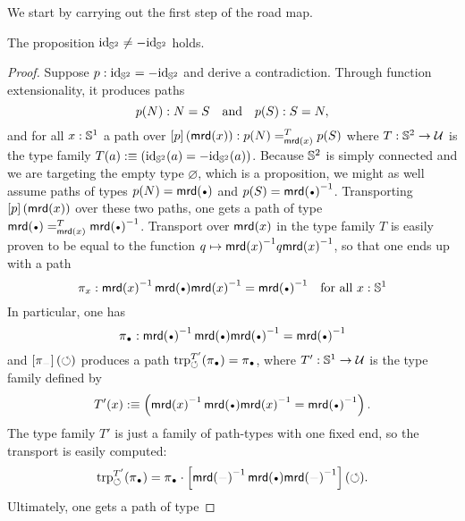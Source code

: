 \documentclass[english,a4]{article}
\renewcommand{\ap}[1]{\left[{#1}\right]}
\begin{document}
We start by carrying out the first step of the road map.

\begin{lemma}
  \label{lemma:S2-id-neq-minusid}%
  The proposition $\mathord{\mathrm{id}}_{{\mathbb S^{2}}} \neq -\mathord{\mathrm{id}}_{{\mathbb S^{2}}}$ holds.
\end{lemma}
\begin{proof}
  Suppose $p:\mathord{\mathrm{id}}_{{\mathbb S^{2}}} = -\mathord{\mathrm{id}}_{{\mathbb S^{2}}}$ and derive a contradiction. Through
  function extensionality, it produces paths
  \begin{displaymath}
    p(N) : N = S
    \quad\text{and}\quad
    p(S) : S = N,
  \end{displaymath}
  and for all $x:{{\mathbb S^{1}}}$ a path over
  $\ap p (\mrd(x))\from \pathover {p(N)} T {\mrd(x)} {p(S)}$ where
  $T: {{\mathbb S^{2}}} \to \mathcal{U}$ is the type family
  $T(a)\mathrel{\hbox{:}\mkern-5mu\equiv} (\mathord{\mathrm{id}}_{{\mathbb S^{2}}}(a) = -\mathord{\mathrm{id}}_{{\mathbb S^{2}}}(a))$. Because ${{\mathbb S^{2}}}$ is simply
  connected and we are targeting the empty type $\varnothing$, which
  is a proposition, we might as well assume paths of types $p(N)=\mrd(\base)$
  and $p(S) = \inv{\mrd(\base)}$. Transporting $\ap p(\mrd(x))$ over
  these two paths, one gets a path of type
  $\pathover {\mrd(\base)} T {\mrd(x)} {\inv{\mrd(\base)}}$. 
  Transport over $\operatorname{\mathsf{mrd}}(x)$ in the type family $T$ is
  easily proven to be equal to the function
  $q \mapsto {\operatorname{\mathsf{mrd}}(x)}^{-1} q {\operatorname{\mathsf{mrd}}(x)}^{-1}$, so that one
  ends up with a path
  \begin{displaymath}
    \pi_x\from \inv{\mrd(x)} \mrd(\base) \inv{\mrd(x)} = \inv{\mrd(\base)}
    \quad
    \text{for all }x\from\Sc
  \end{displaymath}
  In particular, one has
  \begin{displaymath}
    \pi_{\base} \from \inv{\mrd(\base)} \mrd(\base) \inv{\mrd(\base)}
    = \inv{\mrd(\base)}
  \end{displaymath}
  and $\ap {\pi_{\blank}} (\Sloop)$ produces a path
  $\trp [T'] \Sloop (\pi_{\base}) = \pi_{\base}$, where $T':{{\mathbb S^{1}}}\to\mathcal{U}$
  is the type family defined by
  \begin{displaymath}
    T'(x) \defequi \left(\inv{\mrd(x)}\mrd(\base)\inv{\mrd(x)}
      = \inv{\mrd(\base)} \right).
  \end{displaymath}
  The type family $T'$ is just a family of path-types with one fixed
  end, so the transport is easily computed:
  \begin{displaymath}
    \trp [T'] \Sloop (\pi_{\base}) = \pi_{\base} \cdot
    \ap{\inv{\mrd(\blank)} \mrd(\base) \inv{\mrd(\blank)}}(\Sloop).
  \end{displaymath}
  Ultimately, one gets a path of type

\end{proof}
\end{document}
